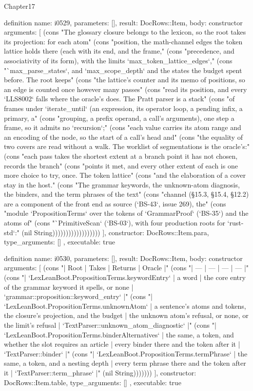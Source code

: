 \begin{lexlean}{Chapter17}
\begin{semanticmodule}
definition{
  name: i0529,
  parameters: [],
  result: DocRows::Item,
  body: constructor{
    arguments: [
      (cons "The glossary closure belongs to the lexicon, so the root takes its projection: for each atom" (cons "position, the math-channel edges the token lattice holds there (each with its end, and the frame," (cons "precedence, and associativity of its form), with the limits `max_token_lattice_edges`," (cons "`max_parse_states`, and `max_scope_depth` and the states the budget spent before. The root keeps" (cons "the lattice's counter and its memo of positions, so an edge is counted once however many passes" (cons "read its position, and every `LLS8002` falls where the oracle's does. The Pratt parser is a stack" (cons "of frames under `iterate_until` (an expression, its operator loop, a pending infix, a primary, a" (cons "grouping, a prefix operand, a call's arguments), one step a frame, so it admits no `recursion`;" (cons "each value carries its atom range and an encoding of the node, so the start of a call's head and" (cons "the equality of two covers are read without a walk. The worklist of segmentations is the oracle's:" (cons "each pass takes the shortest extent at a branch point it has not chosen, records the branch" (cons "points it met, and every other extent of each is one more choice to try, once. The token lattice" (cons "and the elaboration of a cover stay in the host." (cons "The grammar keywords, the unknown-atom diagnosis, the binders, and the term phrases of the text" (cons "channel (§15.3, §15.4, §12.2) are a component of the front end as source (`BS-43`, issue 269), the" (cons "module `PropositionTerms` over the tokens of `GrammarProof` (`BS-35`) and the atoms of" (cons "`PrimitiveScan` (`BS-03`), with four production roots for `rust-std`:" (nil String))))))))))))))))))
    ],
    constructor: DocRows::Item.para,
    type_arguments: []
  },
  executable: true
}

definition{
  name: i0530,
  parameters: [],
  result: DocRows::Item,
  body: constructor{
    arguments: [
      (cons "| Root | Takes | Returns | Oracle |" (cons "| --- | --- | --- | --- |" (cons "| `LexLeanBoot.PropositionTerms.keywordEntry` | a word | the core entry of the grammar keyword it spells, or none | `grammar::proposition::keyword_entry` |" (cons "| `LexLeanBoot.PropositionTerms.unknownAtom` | a sentence's atoms and tokens, the closure's projection, and the budget | the unknown atom's refusal, or none, or the limit's refusal | `TextParser::unknown_atom_diagnostic` |" (cons "| `LexLeanBoot.PropositionTerms.binderAlternatives` | the same, a token, and whether the slot requires an article | every binder there and the token after it | `TextParser::binder` |" (cons "| `LexLeanBoot.PropositionTerms.termPhrase` | the same, a token, and a nesting depth | every term phrase there and the token after it | `TextParser::term_phrase` |" (nil String)))))))
    ],
    constructor: DocRows::Item.table,
    type_arguments: []
  },
  executable: true
}


\end{semanticmodule}
\end{lexlean}
